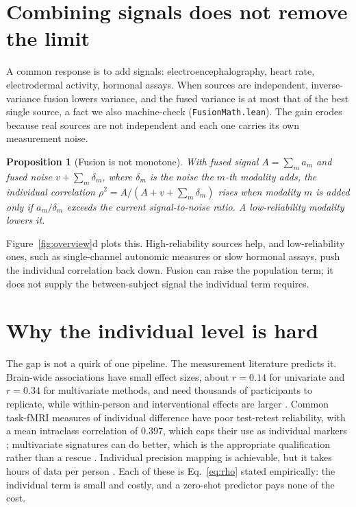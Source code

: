 \documentclass[11pt]{article}
\newtheorem{proposition}{Proposition}
\begin{document}
\section*{Combining signals does not remove the limit}
A common response is to add signals: electroencephalography, heart rate, electrodermal activity, hormonal
assays. When sources are independent, inverse-variance fusion lowers variance, and the fused variance is at
most that of the best single source, a fact we also machine-check (\texttt{FusionMath.lean}). The gain
erodes because real sources are not independent and each one carries its own measurement noise.

\begin{proposition}[Fusion is not monotone]
With fused signal $A=\sum_m a_m$ and fused noise $v+\sum_m\delta_m$, where $\delta_m$ is the noise the
$m$-th modality adds, the individual correlation $\rho^2=A/(A+v+\sum_m\delta_m)$ rises when modality $m$ is
added only if $a_m/\delta_m$ exceeds the current signal-to-noise ratio. A low-reliability modality lowers it.
\end{proposition}

Figure~\ref{fig:overview}d plots this. High-reliability sources help, and low-reliability ones, such as
single-channel autonomic measures or slow hormonal assays, push the individual correlation back down. Fusion
can raise the population term; it does not supply the between-subject signal the individual term requires.

\section*{Why the individual level is hard}
The gap is not a quirk of one pipeline. The measurement literature predicts it. Brain-wide associations have
small effect sizes, about $r=0.14$ for univariate and $r=0.34$ for multivariate methods, and need thousands
of participants to replicate, while within-person and interventional effects are larger \citep{marek2022,
kang2024}. Common task-fMRI measures of individual difference have poor test-retest reliability, with a mean
intraclass correlation of $0.397$, which caps their use as individual markers \citep{elliott2020}; multivariate
signatures can do better, which is the appropriate qualification rather than a rescue \citep{kragel2021}.
Individual precision mapping is achievable, but it takes hours of data per person \citep{gordon2017,du2025}.
Each of these is Eq.~\ref{eq:rho} stated empirically: the individual term is small and costly, and a zero-shot
predictor pays none of the cost.
\end{document}
